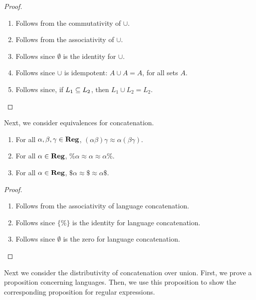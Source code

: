 \begin{proof}
\begin{enumerate}[(1)]
\item Follows from the commutativity of $\cup$.

\item Follows from the associativity of $\cup$.

\item Follows since $\emptyset$ is the identity for $\cup$.

\item Follows since $\cup$ is idempotent: $A\cup A=A$,
for all sets $A$.

\item Follows since, if $L_1\subseteq L_2$, then $L_1\cup L_2=L_2$.
\end{enumerate}
\end{proof}

Next, we consider equivalences for concatenation.
%

\begin{proposition}
\label{RegConcat}
\begin{enumerate}[(1)]
\item For all $\alpha,\beta,\gamma\in\mathbf{Reg}$,
$(\alpha\beta)\gamma\approx\alpha(\beta\gamma)$.

\item For all $\alpha\in\mathbf{Reg}$, $\%\alpha\approx\alpha\approx\alpha\%$.

\item For all $\alpha\in\mathbf{Reg}$, $\$\alpha\approx\$ \approx
\alpha\$$.
\end{enumerate}
\end{proposition}

\begin{proof}
\begin{enumerate}[(1)]
\item Follows from the associativity of language concatenation.

\item Follows since $\{\%\}$ is the identity for language concatenation.

\item Follows since $\emptyset$ is the zero for language
concatenation.
\end{enumerate}
\end{proof}

Next we consider the distributivity of concatenation over union.
First, we prove a proposition concerning languages.  Then,
we use this proposition to show the corresponding proposition
for regular expressions.

